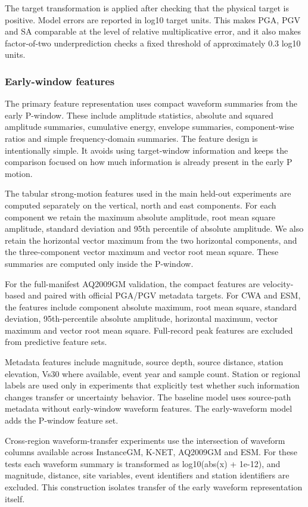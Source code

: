 \documentclass[
  10pt,
]{article}
\begin{document}
The target transformation is applied after checking that the physical
target is positive. Model errors are reported in log10 target units.
This makes PGA, PGV and SA comparable at the level of relative
multiplicative error, and it also makes factor-of-two underprediction
checks a fixed threshold of approximately 0.3 log10 units.

\subsubsection{Early-window features}\label{early-window-features}

The primary feature representation uses compact waveform summaries from
the early P-window. These include amplitude statistics, absolute and
squared amplitude summaries, cumulative energy, envelope summaries,
component-wise ratios and simple frequency-domain summaries. The feature
design is intentionally simple. It avoids using target-window
information and keeps the comparison focused on how much information is
already present in the early P motion.

The tabular strong-motion features used in the main held-out experiments
are computed separately on the vertical, north and east components. For
each component we retain the maximum absolute amplitude, root mean
square amplitude, standard deviation and 95th percentile of absolute
amplitude. We also retain the horizontal vector maximum from the two
horizontal components, and the three-component vector maximum and vector
root mean square. These summaries are computed only inside the P-window.

For the full-manifest AQ2009GM validation, the compact features are
velocity-based and paired with official PGA/PGV metadata targets. For
CWA and ESM, the features include component absolute maximum, root mean
square, standard deviation, 95th-percentile absolute amplitude,
horizontal maximum, vector maximum and vector root mean square.
Full-record peak features are excluded from predictive feature sets.

Metadata features include magnitude, source depth, source distance,
station elevation, Vs30 where available, event year and sample count.
Station or regional labels are used only in experiments that explicitly
test whether such information changes transfer or uncertainty behavior.
The baseline model uses source-path metadata without early-window
waveform features. The early-waveform model adds the P-window feature
set.

Cross-region waveform-transfer experiments use the intersection of
waveform columns available across InstanceGM, K-NET, AQ2009GM and ESM.
For these tests each waveform summary is transformed as log10(abs(x) +
1e-12), and magnitude, distance, site variables, event identifiers and
station identifiers are excluded. This construction isolates transfer of
the early waveform representation itself.
\end{document}
